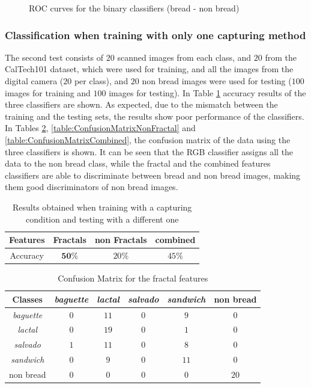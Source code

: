 \documentclass[oneside,a4paper,english,links]{amca}
\begin{document}
\begin{figure}
\caption{ROC curves for the binary classifiers (bread - non bread)}

\end{figure}

\subsubsection{Classification when training with only one capturing method}
The second test consists of $20$ scanned images from each class, and $20$ from the CalTech101 dataset, which were used for training, and all the images from the digital camera ($20$ per class), and $20$ non bread images were used for testing ($100$ images for training and $100$ images for testing). In Table \ref{table:tableRobustnessTest2} accuracy results of the three classifiers are shown. As expected, due to the mismatch between the training and the testing sets, the results show poor performance of the classifiers. In Tables \ref{table:ConfusionMatrixFractal}, \ref{table:ConfusionMatrixNonFractal} and \ref{table:ConfusionMatrixCombined}, the confusion matrix of the data using the three classifiers is shown. It can be seen that the RGB classifier assigns all the data to the non bread class, while the fractal and the combined features classifiers are able to discriminate between bread and non bread images, making them good discriminators of non bread images.

\begin{table}[htb]
\centering
\begin{tabular}{|c|c|c|c|}
    \hline
    Features & Fractals & non Fractals & combined\\
    \hline
    \hline
    Accuracy  & $\textbf{50}\%$ & $20\%$ & $45\%$\\
    \hline
\end{tabular}
\caption{Results obtained when training with a capturing condition and testing with a different one}
\label{table:tableRobustnessTest2}
\end{table}


\begin{table}[htb]
\centering
\begin{tabular}{|c|c|c|c|c|c|}
    \hline
    Classes & {\em baguette} & {\em lactal} & {\em salvado} & {\em sandwich} & non bread\\
    \hline
    \hline
    {\em baguette}  & $0$ & $11$ & $0$ & $9$  & $0$\\
    \hline
    {\em lactal}    & $0$ & $19$ & $0$ & $1$  & $0$\\
    \hline
    {\em salvado}   & $1$ & $11$ & $0$ & $8$  & $0$\\
    \hline
    {\em sandwich}  & $0$ & $9$  & $0$ & $11$ & $0$\\
    \hline
    non bread       & $0$ & $0$  & $0$ & $0$  & $20$\\
    \hline
\end{tabular}
\caption{Confusion Matrix for the fractal features}
\label{table:ConfusionMatrixFractal}
\end{table}
\end{document}
